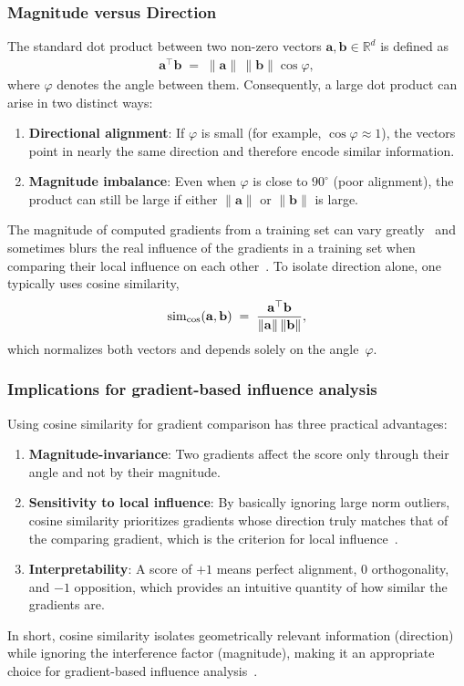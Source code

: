 \subsubsection{Magnitude versus Direction}
The standard dot product between two non-zero vectors
$\mathbf{a},\mathbf{b}\in\mathbb{R}^d$ is defined as
\begin{align*}
    \mathbf{a}^{\top}\mathbf{b}
    \;=\;
    \|\mathbf{a}\|\,\|\mathbf{b}\|\cos{\varphi},
\end{align*}
where $\varphi$ denotes the angle between them. Consequently, a large dot product can arise in two distinct ways:
\begin{enumerate}
    \item \textbf{Directional alignment}: If $\varphi$ is small (for example, $\cos{\varphi} \approx 1$), the vectors point in nearly the same direction and therefore encode similar information.
    \item \textbf{Magnitude imbalance}: Even when $\varphi$ is close to $90^{\circ}$ (poor alignment), the product can still be large if either $\|\mathbf{a}\|$ or $\|\mathbf{b}\|$ is large.
\end{enumerate}
The magnitude of computed gradients from a training set can vary greatly~\cite{sui2021representer} and sometimes blurs the real influence of the gradients in a training set when comparing their local influence on each other~\cite{barshan2020relatifidentifyingexplanatorytraining}. To isolate direction alone, one typically uses cosine similarity,
\begin{align*}
    \operatorname{sim}_{\cos}(\mathbf{a},\mathbf{b})
    \;=\;
    \frac{\mathbf{a}^{\top}\mathbf{b}}
         {\|\mathbf{a}\|\,\|\mathbf{b}\|},
\end{align*}
which normalizes both vectors and depends solely on the angle~$\varphi$.

\subsubsection{Implications for gradient-based influence analysis}
Using cosine similarity for gradient comparison has three practical advantages:
\begin{enumerate}
    \item \textbf{Magnitude-invariance}: Two gradients affect the score only through their angle and not by their magnitude.
    \item \textbf{Sensitivity to local influence}: By basically ignoring large norm outliers, cosine similarity prioritizes gradients whose direction truly matches that of the comparing gradient, which is the criterion for local influence~\cite{barshan2020relatifidentifyingexplanatorytraining}.
    \item \textbf{Interpretability}: A score of $+1$ means perfect alignment, $0$ orthogonality, and $-1$ opposition, which provides an intuitive quantity of how similar the gradients are.
\end{enumerate}
In short, cosine similarity isolates geometrically relevant information (direction) while
ignoring the interference factor (magnitude), making it an appropriate choice for
gradient-based influence analysis~\cite{Hammoudeh_2024}.


